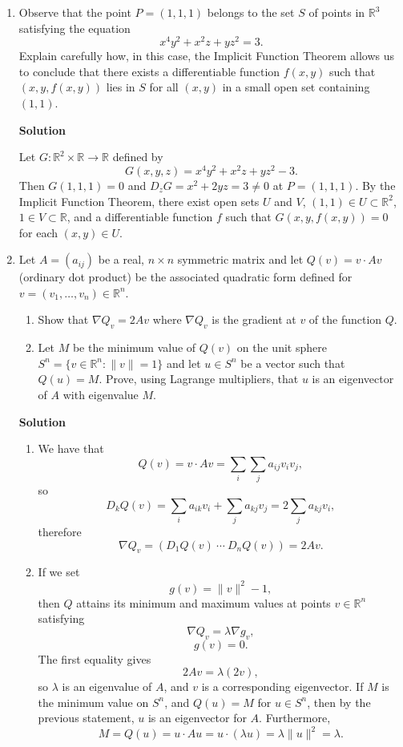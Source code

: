 \documentclass{article}
\begin{document}
\begin{enumerate}
\item Observe that the point \(P = (1,1,1)\) belongs to the set \(S\) of points in \(\mathbb{R}^3\) satisfying the equation
\[x^4y^2 + x^2z + yz^2 = 3.\]
Explain carefully how, in this case, the Implicit Function Theorem allows us to conclude that there exists a differentiable function \(f(x,y)\) such that \((x,y,f(x,y))\) lies in \(S\) for all \((x,y)\) in a small open set containing \((1,1)\).

{\bf Solution}

Let \(G : \mathbb{R}^2 \times \mathbb{R} \to \mathbb{R}\) defined by
\[G(x,y,z) = x^4y^2 + x^2z + yz^2 - 3.\]
Then \(G(1,1,1) = 0\) and \(D_zG = x^2 + 2yz = 3 \neq 0\) at \(P = (1,1,1)\).  By the Implicit Function Theorem, there exist open sets \(U\) and \(V\), \((1,1) \in U \subset \mathbb{R}^2\), \(1 \in V \subset \mathbb{R}\), and a differentiable function \(f\) such that \(G(x,y,f(x,y)) = 0\) for each \((x,y) \in U\).



\item Let \(A = (a_{ij})\) be a real, \(n \times n\) symmetric matrix and let \(Q(v) = v \cdot Av\) (ordinary dot product) be the associated quadratic form defined for \(v = (v_1, \ldots, v_n) \in \mathbb{R}^n\).

\begin{enumerate}
\item Show that \(\nabla Q_v = 2Av\) where \(\nabla Q_v\) is the gradient at \(v\) of the function \(Q\).

\item Let \(M\) be the minimum value of \(Q(v)\) on the unit sphere \(S^n = \{v \in \mathbb{R}^n : \|v\| = 1\}\) and let \(u \in S^n\) be a vector such that \(Q(u) = M\).  Prove, using Lagrange multipliers, that \(u\) is an eigenvector of \(A\) with eigenvalue \(M\).

\end{enumerate}

{\bf Solution}

\begin{enumerate}
\item We have that
\[Q(v) = v \cdot Av = \sum_i \sum_j a_{ij} v_i v_j,\]
so
\[D_kQ(v) = \sum_i a_{ik} v_i + \sum_j a_{kj} v_j = 2 \sum_j a_{kj} v_i,\]
therefore
\[\nabla Q_v = \left( D_1Q(v) \ \cdots \ D_nQ(v) \right) = 2 A v.\]

\item If we set
\[g(v) = \|v\|^2 - 1,\]
then \(Q\) attains its minimum and maximum values at points \(v \in \mathbb{R}^n\) satisfying
\[\nabla Q_v = \lambda \nabla g_v,\]
\[g(v) = 0.\]
The first equality gives
\[2Av = \lambda (2v),\]
so \(\lambda\) is an eigenvalue of \(A\), and \(v\) is a corresponding eigenvector.  If \(M\) is the minimum value on \(S^n\), and \(Q(u) = M\) for \(u \in S^n\), then by the previous statement, \(u\) is an eigenvector for \(A\).  Furthermore,
\[M = Q(u) = u \cdot Au = u \cdot (\lambda u) = \lambda \|u\|^2 = \lambda.\]


\end{enumerate}
\end{enumerate}
\end{document}

